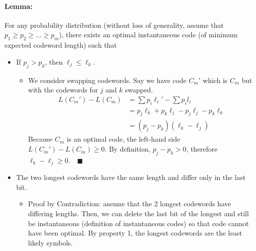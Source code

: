 \documentclass[12pt]{article}
\begin{document}
\paragraph{Lemma:} For any probability distribution (without loss of generality, assume that $p_1 \ge p_2 \ge \dots \ge p_m$), there exists an optimal instantaneous code (of minimum expected codeword length) such that 
\begin{itemize}
    \item[1.] If $p_j > p_k$, then $\ell_j \le \ell_k$.
    \begin{itemize}
        \item We consider swapping codewords. Say we have code $C_m'$ which is $C_m$ but with the codewords for $j$ and $k$ swapped.
        \begin{align*}
        L(C_m') - L(C_m) &= \sum p_i \ell_i' - \sum p_i l_i \\
        &= p_j \ell_k + p_k \ell_j - p_j \ell_j - p_k \ell_k \\
        &= (p_j - p_k) (\ell_k - \ell_j)
        \end{align*}
        Because $C_m$ is an optimal code, the left-hand side $L(C_m') - L(C_m) \ge 0$. By definition, $p_j - p_k > 0$, therefore $\ell_k - \ell_j \ge 0. \quad \blacksquare$
    \end{itemize}
    

      \item[2.] The two longest codewords have the same length and differ only in the last bit.
    \begin{itemize}
        \item Proof by Contradiction: assume that the 2 longest codewords have differing lengths. Then, we can delete the last bit of the longest and still be instantaneous (definition of instantaneous codes) so that code cannot have been optimal. By property 1, the longest codewords are the least likely symbols.


\end{itemize}
\end{itemize}
\end{document}
